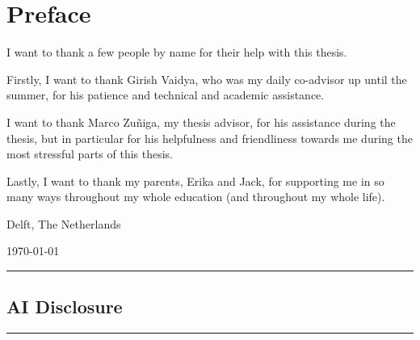 \chapter*{Preface}


\vspace{1\baselineskip}

I want to thank a few people by name for their help with this thesis.

Firstly, I want to thank Girish Vaidya, who was my daily co-advisor up until the summer, for his patience and technical and academic assistance.

I want to thank Marco Zuñiga, my thesis advisor, for his assistance during the thesis, but in particular for his helpfulness and friendliness towards me during the most stressful parts of this thesis.

Lastly, I want to thank my parents, Erika and Jack, for supporting me in so many ways throughout my whole education (and throughout my whole life).



\vspace{1\baselineskip}

\reportAuthor

\vspace{1\baselineskip}

\noindent
Delft, The Netherlands

\noindent
\today


\vspace{3em}
\hrule
\vspace{-.5em}

\section*{AI Disclosure}

\hrule
\vspace{1em}

